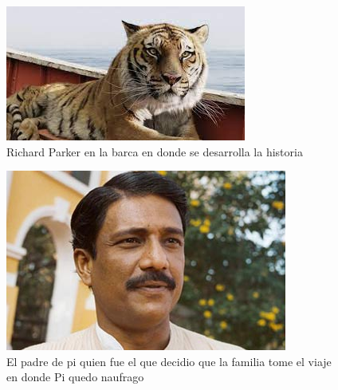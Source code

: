 \documentclass[a5 paper, 11pt]{article}
\begin{document}
\begin{figure}[H]
    \centering
    \includegraphics[scale=0.50,rotate=-18]{r parker.jpg}
    \caption{Richard Parker en la barca en donde se desarrolla la historia}
    
\end{figure}
\begin{figure}[H]
    \centering
    \includegraphics[scale=0.50,rotate=8]{papa pi.jpg}
    \caption{El padre de pi quien fue el que decidio que la familia tome el viaje en donde Pi quedo naufrago}
    
\end{figure}
\hspace{-2cm}
\end{document}
